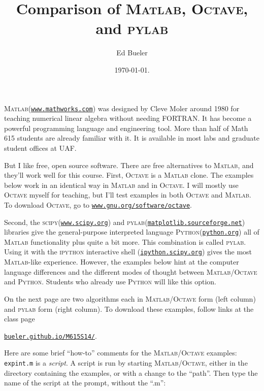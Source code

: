 \documentclass[11pt]{amsart}
\newcommand{\Matlab}{\textsc{Matlab}\xspace}
\newcommand{\Octave}{\textsc{Octave}\xspace}
\newcommand{\python}{\textsc{Python}\xspace}
\newcommand{\pylab}{\textsc{pylab}\xspace}
\newcommand{\scipy}{\textsc{scipy}\xspace}
\begin{document}
\title{Comparison of \textsc{Matlab}, \textsc{Octave}, and \textsc{pylab}}

\author{Ed Bueler}

\date{\today.}

\maketitle
\normalsize
\thispagestyle{empty}

\newcommand{\hrf}[2]{\href{#1}{\texttt{#2}}}

\Matlab (\hrf{http://www.mathworks.com/}{www.mathworks.com}) was designed by Cleve Moler around 1980 for teaching numerical linear algebra without needing FORTRAN.  It has become a powerful programming language and engineering tool.  More than half of Math 615 students are already familiar with it.  It is available in most labs and graduate student offices at UAF.

But I like free, open source software.  There are free alternatives to \Matlab, and they'll work well for this course.  First, \Octave is a \Matlab clone.  The examples below work in an identical way in \Matlab and in \Octave.  I will mostly use \Octave myself for teaching, but I'll test examples in both \Octave and \Matlab.  To download \Octave, go to 
\hrf{http://www.gnu.org/software/octave/}{www.gnu.org/software/octave}.

Second, the \scipy (\hrf{http://www.scipy.org/}{www.scipy.org}) and \pylab (\hrf{http://matplotlib.sourceforge.net/}{matplotlib.sourceforge.net}) libraries give the general-purpose interpreted language \python (\hrf{http://python.org/}{python.org}) all of \Matlab functionality plus quite a bit more.  This combination is called \pylab.  Using it with the \textsc{ipython} interactive shell (\hrf{http://ipython.scipy.org/moin/}{ipython.scipy.org}) gives the most \Matlab-like experience.  However, the examples below hint at the computer language differences and the different modes of thought between \Matlab/\Octave and \python.  Students who already use \python will like this option.

On the next page are two algorithms each in \Matlab/\Octave form (left column) and \pylab form (right column).  To download these examples, follow links at the class page

\centerline{\hrf{http://bueler.github.io/M615S14/}{bueler.github.io/M615S14/}.}

Here are some brief ``how-to'' comments for the \Matlab/\Octave examples: \texttt{expint.m} is a \emph{script}.  A script is run by starting \Matlab/\Octave, either in the directory containing the examples, or with a change to the ``path''.  Then type the name of the script at the prompt, without the ``.m'':
\end{document}
